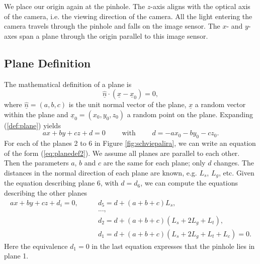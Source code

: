 \documentclass{svjour3}                     %
\begin{document}
We place our origin again at the pinhole. The $z$-axis aligns with the optical axis of the camera, i.e. the viewing direction of the camera. All the light entering the camera travels through the pinhole and falls on the image sensor. The $x$- and $y$-axes span a plane through the origin parallel to this image sensor. 

\subsection{Plane Definition}
The mathematical definition of a plane is
\begin{equation}
	\label{def:plane}
	\underline{\hat{n}} \cdot (\underline{x}-\underline{x}_0) = 0,
\end{equation}
where $\underline{\hat{n}} = (a,b,c)$ is the unit normal vector of the plane, $\underline{x}$ a random vector within the plane and $\underline{x}_0=(x_0, y_0, z_0)$ a random point on the plane. Expanding (\ref{def:plane}) yields
\begin{equation}
	\label{eq:planedef2}
	ax+by+cz + d = 0 \qquad \mbox{ with } \qquad d = - a x_0 - b y_0 - c z_0.
\end{equation}
For each of the planes 2 to 6 in Figure \ref{fig:schviepalira}, we can write an equation of the form (\ref{eq:planedef2}). We assume all planes are parallel to each other. Then the parameters $a$, $b$ and $c$ are the same for each plane; only $d$ changes. The distances in the normal direction of each plane are known, e.g. $L_s$, $L_g$, etc. Given the equation describing plane 6, with $d=d_6$,
we can compute the equations describing the other planes
\begin{align}
a x + b y + c z + d_i = 0, \qquad  
& d_5 = d + (a+b+c) L_s, \nonumber \\
& ..., \nonumber \\ 
& d_2 = d + (a+b+c) (L_s+2L_g+L_t), \nonumber \\
\label{eq:planedef1}
& d_1 = d + (a+b+c) (L_s+2L_g+L_t+L_c) = 0.
\end{align}
Here the equivalence $d_1=0$ in the last equation expresses that the pinhole lies in plane 1. 
\end{document}
